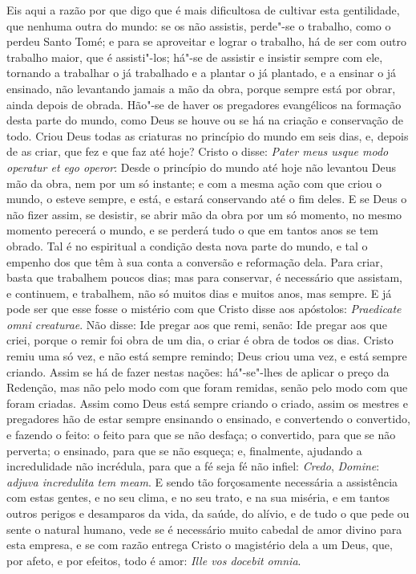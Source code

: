 Eis aqui a razão por que digo que é mais dificultosa de cultivar esta
gentilidade, que nenhuma outra do mundo: se os não assistis, perde"-se o
trabalho, como o perdeu Santo Tomé; e para se aproveitar e lograr o
trabalho, há de ser com outro trabalho maior, que é assisti"-los; há"-se
de assistir e insistir sempre com ele, tornando a trabalhar o já
trabalhado e a plantar o já plantado, e a ensinar o já ensinado, não
levantando jamais a mão da obra, porque sempre está por obrar, ainda
depois de obrada. Hão"-se de haver os pregadores evangélicos na formação
desta parte do mundo, como Deus se houve ou se há na criação e
conservação de todo. Criou Deus todas as criaturas no princípio do mundo
em seis dias, e, depois de as criar, que fez e que faz até hoje? Cristo
o disse: \emph{Pater meus usque modo operatur et ego operor}: Desde o
princípio do mundo até hoje não levantou Deus mão da obra, nem por um só
instante; e com a mesma ação com que criou o mundo, o esteve sempre, e
está, e estará conservando até o fim deles. E se Deus o não fizer assim,
se desistir, se abrir mão da obra por um
só momento, no mesmo momento perecerá o mundo, e se perderá tudo o que
em tantos anos se tem obrado. Tal é no espiritual a condição desta nova
parte do mundo, e tal o empenho dos que têm à sua conta a conversão e
reformação dela. Para criar, basta que trabalhem poucos dias; mas para
conservar, é necessário que assistam, e continuem, e trabalhem, não só
muitos dias e muitos anos, mas sempre. E já pode ser que esse fosse o
mistério com que Cristo disse aos apóstolos: \emph{Praedicate omni
creaturae}. Não disse: Ide pregar aos que remi, senão: Ide
pregar aos que criei, porque o remir foi obra de um dia, o criar é obra
de todos os dias. Cristo remiu uma só vez, e não está sempre remindo;
Deus criou uma vez, e está sempre criando. Assim se há de fazer nestas
nações: há"-se"-lhes de aplicar o preço da Redenção, mas não pelo modo com
que foram remidas, senão pelo modo com que foram criadas. Assim como
Deus está sempre criando o criado, assim os mestres e pregadores hão de
estar sempre ensinando o ensinado, e convertendo o convertido, e fazendo
o feito: o feito para que se não desfaça; o convertido, para que se não
perverta; o ensinado, para que se não esqueça; e, finalmente, ajudando a
incredulidade não incrédula, para que a fé seja fé não infiel:
\emph{Credo}, \emph{Domine}: \emph{adjuva incredulita tem meam}. E sendo
tão forçosamente necessária a assistência com estas gentes, e no seu
clima, e no seu trato, e na sua miséria, e em tantos outros perigos e
desamparos da vida, da saúde, do alívio, e de tudo o que pede ou sente o
natural humano, vede se é necessário muito cabedal de amor divino para
esta empresa, e se com razão entrega Cristo o magistério dela a um Deus,
que, por afeto, e por efeitos, todo é amor: \emph{Ille vos docebit
omnia}.

